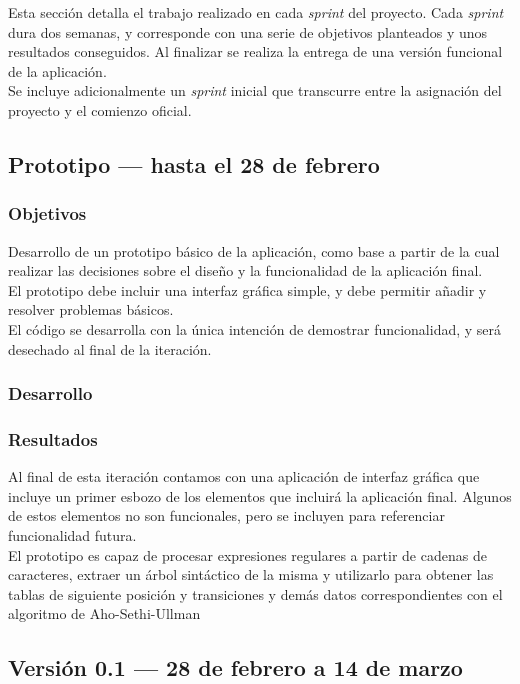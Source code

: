 
Esta sección detalla el trabajo realizado en cada \emph{sprint} del proyecto. Cada \emph{sprint} dura dos semanas, y corresponde con una serie de objetivos planteados y unos resultados conseguidos.
Al finalizar se realiza la entrega de una versión funcional de la aplicación.
\\
Se incluye adicionalmente un \emph{sprint} inicial que transcurre entre la asignación del proyecto y el comienzo oficial.

\subsection{Prototipo --- hasta el 28 de febrero}

\subsubsection{Objetivos}
Desarrollo de un prototipo básico de la aplicación, como base a partir de la cual realizar las decisiones sobre el diseño y la funcionalidad de la aplicación final.
\\
El prototipo debe incluir una interfaz gráfica simple, y debe permitir añadir y resolver problemas básicos. \\
El código se desarrolla con la única intención de demostrar funcionalidad, y será desechado al final de la iteración.

\subsubsection{Desarrollo}

\subsubsection{Resultados}
Al final de esta iteración contamos con una aplicación de interfaz gráfica que incluye un primer esbozo de los elementos que incluirá la aplicación final.
Algunos de estos elementos no son funcionales, pero se incluyen para referenciar funcionalidad futura.
\\
El prototipo es capaz de procesar expresiones regulares a partir de cadenas de caracteres, extraer un árbol sintáctico de la misma y utilizarlo para obtener las tablas de siguiente posición y transiciones y demás datos correspondientes con el algoritmo de Aho-Sethi-Ullman

\subsection{Versión 0.1 --- 28 de febrero a 14 de marzo}

